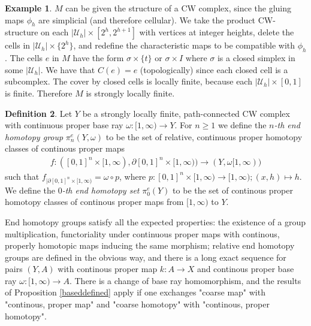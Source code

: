 \documentclass[a4paper,11pt]{article}
\theoremstyle{definition}
\newtheorem{definition}{Definition}[section]
\newtheorem{example}[definition]{Example}
\theoremstyle{plain}
\theoremstyle{remark}
\begin{document}
{\begin{example} \label{CW} $M$ can be given the structure of a CW complex, since the gluing maps $\phi_{h}$ are simplicial (and therefore cellular). We take the product CW-structure on each $|\mathcal{U}_{h}| \times [2^{h},2^{h+1}]$ with vertices at integer heights, delete the cells in $|\mathcal{U}_{h}| \times \{2^h\}$, and redefine the characteristic maps to be compatible with $\phi_{h}$. The cells  $e$ in $M$ have the form $\sigma \times \{t\}$ or $\sigma \times I$ where $\sigma$ is a closed simplex in some $|\mathcal{U}_{h}|$. We have that $C(e) = e$ (topologically) since each closed cell is a subcomplex. The cover by closed cells is locally finite, because each $|\mathcal{U}_{h}| \times [0,1]$ is finite. Therefore $M$ is strongly locally finite. 
\end{example}

\begin{definition} Let $Y$ be a strongly locally finite, path-connected CW complex with continuous proper base ray $\omega: [1,\infty)\rightarrow Y$. For $n\geq 1$ we define the \textit{$n$-th end homotopy group} $\pi_n^e(Y,\omega)$ to be the set of relative, continuous proper homotopy classes of continous proper maps 
\begin{align*}
f: ([0,1]^n \times [1,\infty), \partial [0,1]^n \times [1,\infty))\rightarrow (Y,\omega[1,\infty))
\end{align*}
such that $f_{|\partial [0,1]^n \times [1,\infty)} = \omega\circ p$, where $p: [0,1]^n \times [1,\infty)\rightarrow [1,\infty); (x,h)\mapsto h$. \\

We define the \textit{$0$-th end homotopy set} $\pi^e_0(Y)$ to be the set of continous proper homotopy classes of continous proper maps from $[1,\infty)$ to $Y$. 
\end{definition}

End homotopy groups satisfy all the expected properties: the existence of a group multiplication, functoriality under continuous proper maps with continous, properly homotopic maps inducing the same morphism; relative end homotopy groups are defined in the obvious way, and there is a long exact sequence for pairs $(Y,A)$ with continous proper map $k: A\rightarrow X$ and continous proper base ray $\omega: [1,\infty)\rightarrow A$. There is a change of base ray homomorphism, and the results of Proposition \ref{baseddefined} apply if one exchanges "coarse map" with "continous, proper map" and "coarse homotopy" with "continous, proper homotopy". \\

}
\end{document}

